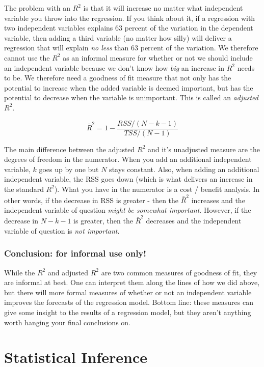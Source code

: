 \documentclass[
]{book}
\begin{document}
The problem with an \(R^2\) is that it will increase no matter what independent variable you throw into the regression. If you think about it, if a regression with two independent variables explains 63 percent of the variation in the dependent variable, then adding a third variable (no matter how silly) will deliver a regression that will explain \emph{no less} than 63 percent of the variation. We therefore cannot use the \(R^2\) as an informal measure for whether or not we should include an independent variable because we don't know how \emph{big} an increase in \(R^2\) needs to be. We therefore need a goodness of fit measure that not only has the potential to increase when the added variable is deemed important, but has the potential to decrease when the variable is unimportant. This is called an \emph{adjusted} \(R^2\).

\[\bar{R}^2 = 1 - \frac{RSS/(N-k-1)}{TSS/(N-1)}\]

The main difference between the adjusted \(R^2\) and it's unadjusted measure are the degrees of freedom in the numerator. When you add an additional independent variable, \(k\) goes up by one but \(N\) stays constant. Also, when adding an additional independent variable, the RSS goes down (which is what delivers an increase in the standard \(R^2\)). What you have in the numerator is a cost / benefit analysis. In other words, if the decrease in RSS is greater - then the \(\bar{R}^2\) increases and the independent variable of question \emph{might be somewhat important}. However, if the decrease in \(N-k-1\) is greater, then the \(\bar{R}^2\) decreases and the independent variable of question is \emph{not important}.

\subsubsection*{Conclusion: for informal use only!}\label{conclusion-for-informal-use-only}

While the \(R^2\) and adjusted \(R^2\) are two common measures of goodness of fit, they are informal at best. One can interpret them along the lines of how we did above, but there will more formal measures of whether or not an independent variable improves the forecasts of the regression model. Bottom line: these measures can give some insight to the results of a regression model, but they aren't anything worth hanging your final conclusions on.

\section{Statistical Inference}\label{statistical-inference}
\end{document}
